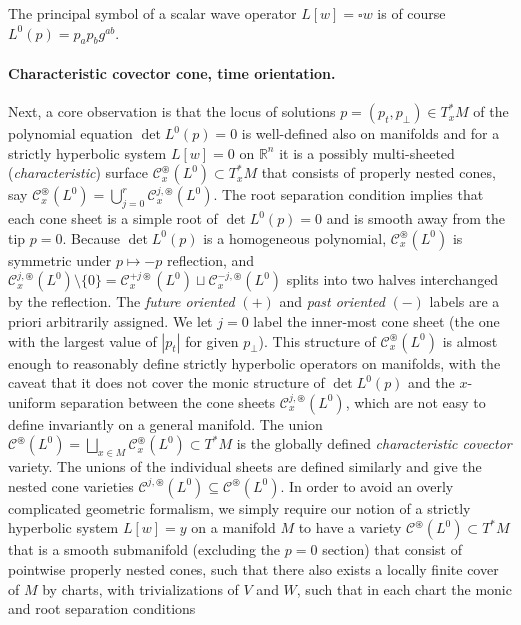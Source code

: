 \documentclass[a4paper]{article}
\theoremstyle{remark}
\newcommand{\oast}{\circledast} %
\begin{document}
The principal symbol of a scalar wave operator $L[w] = \square w$ is of
course $L^0(p) = p_a p_b g^{ab}$.

\paragraph{Characteristic covector cone, time orientation.}
Next, a core observation is that the locus of solutions $p = (p_t, p_\perp) \in
T^*_xM$ of the polynomial equation $\det L^0(p) = 0$ is well-defined also on
manifolds and for a strictly hyperbolic system $L[w]=0$ on $\mathbb{R}^n$ it is
a possibly multi-sheeted (\emph{characteristic}) surface
$\mathcal{C}_x^\oast(L^0) \subset T^*_xM$ that consists of properly nested
cones, say $\mathcal{C}_x^\oast(L^0) = \bigcup_{j=0}^r
\mathcal{C}_x^{j,\oast}(L^0)$. The root separation condition implies that each
cone sheet is a simple root of $\det L^0(p) = 0$ and is smooth away from the
tip $p=0$. Because $\det L^0(p)$ is a homogeneous polynomial,
$\mathcal{C}_x^\oast(L^0)$ is symmetric under $p\mapsto -p$ reflection, and
$\mathcal{C}_x^{j,\oast}(L^0) \setminus \{0\} = \mathcal{C}_x^{+j\oast}(L^0)
\sqcup \mathcal{C}_x^{-j,\oast}(L^0)$ splits into two halves interchanged by
the reflection. The \emph{future oriented} $(+)$ and \emph{past oriented} $(-)$
labels are a priori arbitrarily assigned. We let $j=0$ label the inner-most
cone sheet (the one with the largest value of $|p_t|$ for given $p_\perp$).
This structure of $\mathcal{C}_x^\oast(L^0)$ is almost enough to reasonably
define strictly hyperbolic operators on manifolds, with the caveat that it does
not cover the monic structure of $\det L^0(p)$ and the $x$-uniform separation
between the cone sheets $\mathcal{C}_x^{j,\oast}(L^0)$, which are not easy to
define invariantly on a general manifold. The union $\mathcal{C}^{\oast}(L^0) =
\bigsqcup_{x\in M} \mathcal{C}_x^{\oast}(L^0) \subset T^*M$ is the globally
defined \emph{characteristic covector} variety. The unions of the individual
sheets are defined similarly and give the nested cone varieties
$\mathcal{C}^{j,\oast}(L^0) \subseteq \mathcal{C}^\oast(L^0)$. In order to
avoid an overly complicated geometric formalism, we simply require our notion
of a strictly hyperbolic system $L[w] = y$ on a manifold $M$ to have a variety
$\mathcal{C}^\oast(L^0) \subset T^*M$ that is a smooth submanifold (excluding the
$p=0$ section) that consist of pointwise properly nested cones, such that there
also exists a locally finite cover of $M$ by charts, with trivializations of
$V$ and $W$, such that in each chart the monic and root separation conditions
\end{document}
